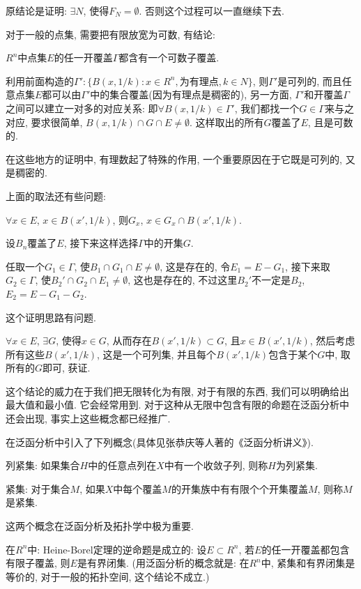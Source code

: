 \documentclass[12pt,a4paper,openany]{book}
\begin{document}
原结论是证明: $\exists N$, 使得$F_N = \emptyset$. 否则这个过程可以一直继续下去.

对于一般的点集, 需要把有限放宽为可数, 有结论:

$R^n$中点集$E$的任一开覆盖$\Gamma$都含有一个可数子覆盖.

利用前面构造的$\Gamma': \{B(x, 1/k) : x \in R^n, \text{为有理点}, k \in N\}$, 则$\Gamma'$是可列的, 而且任意点集$E$都可以由$\Gamma'$中的集合覆盖(因为有理点是稠密的), 另一方面, $\Gamma'$和开覆盖$\Gamma$之间可以建立一对多的对应关系: 即$\forall B(x, 1/k) \in \Gamma'$, 我们都找一个$G \in \Gamma$来与之对应, 要求很简单, $B(x, 1/k) \cap G \cap E \neq \emptyset$. 这样取出的所有$G$覆盖了$E$, 且是可数的.

在这些地方的证明中, 有理数起了特殊的作用, 一个重要原因在于它既是可列的, 又是稠密的.

上面的取法还有些问题:

$\forall x\in E$, $x \in B(x', 1/k)$, 则$G_x$, $x \in G_x \cap B(x', 1/k)$.

设$B_n$覆盖了$E$, 接下来这样选择$\Gamma$中的开集$G$.

任取一个$G_1 \in \Gamma$, 使$B_1 \cap G_1 \cap E \neq \emptyset$, 这是存在的, 令$E_1 = E - G_1$, 接下来取$G_2 \in \Gamma$, 使$B_2' \cap G_2 \cap E_1 \neq \emptyset$, 这也是存在的, 不过这里$B_2'$不一定是$B_2$, $E_2 = E- G_1 - G_2$.

这个证明思路有问题.

$\forall x \in E$, $\exists G$, 使得$x \in G$, 从而存在$B(x', 1/k) \subset G$, 且$x \in B(x', 1/k)$, 然后考虑所有这些$B(x', 1/k)$, 这是一个可列集, 并且每个$B(x', 1/k)$包含于某个$G$中, 取所有的$G$即可, 获证.

这个结论的威力在于我们把无限转化为有限, 对于有限的东西, 我们可以明确给出最大值和最小值. 它会经常用到. 对于这种从无限中包含有限的命题在泛函分析中还会出现, 事实上这些概念都已经推广.

在泛函分析中引入了下列概念(具体见张恭庆等人著的《泛函分析讲义》).

列紧集: 如果集合$H$中的任意点列在$X$中有一个收敛子列, 则称$H$为列紧集.

紧集: 对于集合$M$, 如果$X$中每个覆盖$M$的开集族中有有限个个开集覆盖$M$, 则称$M$是紧集.

这两个概念在泛函分析及拓扑学中极为重要.

在$R^n$中: Heine-Borel定理的逆命题是成立的: 设$E \subset R^n$, 若$E$的任一开覆盖都包含有限子覆盖, 则$E$是有界闭集. (用泛函分析的概念就是: 在$R^n$中, 紧集和有界闭集是等价的, 对于一般的拓扑空间, 这个结论不成立.)
\end{document}
